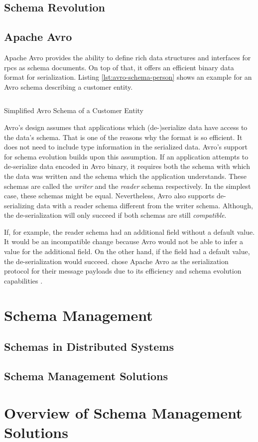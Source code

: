 \subsection{Schema Revolution}

\subsection{Apache Avro}

Apache Avro provides the ability to define rich data structures and interfaces for \glspl{rpc} as schema documents.
On top of that, it offers an efficient binary data format for serialization.
Listing \ref{lst:avro-schema-person} shows an example for an Avro schema describing a customer entity.
\parencite{apache_software_foundation_apache_2021}

\begin{listing}[H]
  \inputminted{json}{assets/src/Customer.avsc}
  \caption{Simplified Avro Schema of a Customer Entity}\label{lst:avro-schema-person}
\end{listing}

Avro's design assumes that applications which (de-)serialize data have access to the data's schema.
That is one of the reasons why the format is so efficient.
It does not need to include type information in the serialized data.
Avro's support for schema evolution builds upon this assumption.
If an application attempts to de-serialize data encoded in Avro binary, it requires both the schema with which the data was written and the schema which the application understands.
These schemas are called the \emph{writer} and the \emph{reader} schema respectively.
In the simplest case, these schemas might be equal.
Nevertheless, Avro also supports de-serializing data with a reader schema different from the writer schema.
Although, the de-serialization will only succeed if both schemas are still \emph{compatible}.
\parencite{apache_software_foundation_apache_2021}

If, for example, the reader schema had an additional field without a default value.
It would be an incompatible change because Avro would not be able to infer a value for the additional field.
On the other hand, if the field had a default value, the de-serialization would succeed.
\citeauthor{kreps_kafka_2011} chose Apache Avro as the serialization protocol for their message payloads due to its efficiency and schema evolution capabilities \parencite{kreps_kafka_2011}. 

\section{Schema Management}

\subsection{Schemas in Distributed Systems}

\subsection{Schema Management Solutions}

\section{Overview of Schema Management Solutions}
